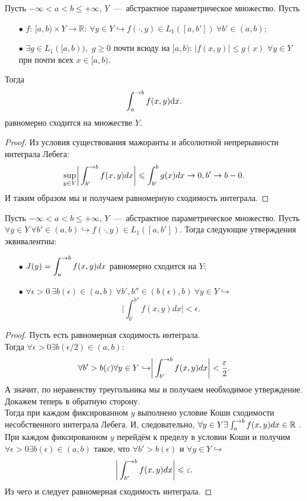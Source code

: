 \begin{theorem}
    Пусть $-\infty < a < b \leq +\infty$, $Y$~---~абстрактное параметрическое множество. Пусть
    \begin{enumerate}
        \item[$\bullet$] $f$: $[a, b) \times Y \to \mathbb{R}$: $\forall y \in Y \hookrightarrow f (\cdot, y) \in L_1 ([a, b']) \ \forall b' \in (a, b)$;
        \item[$\bullet$] $\exists g \in L_1 ([a, b)),$ $g \geq 0$ почти всюду на $[a, b)$: $|f(x, y)| \leq g(x)$ $\forall y \in Y$ при почти всех $x \in [a, b)$.
    \end{enumerate}
    Тогда \[
              \int_a^{\rightarrow b} f(x, y) \text{d}x.
    \]
    равномерно сходится на множестве $Y$.
\end{theorem}
\begin{proof}
    Из условия существования мажоранты и абсолютной непрерывности интеграла Лебега:
    \[
        \sup\limits_{y \in Y} \biggr| \int_{b'}^{\rightarrow b} f(x, y)dx \biggr| \leqslant \int_{b'}^{b} g(x)dx \rightarrow 0, b' \rightarrow b - 0.
    \]
    И таким образом мы и получаем равномерную сходимость интеграла.
\end{proof}
\begin{theorem}
    Пусть $-\infty < a < b \leq +\infty$, $Y$~---~абстрактное параметрическое множество. Пусть $\forall y \in Y \ \forall b' \in (a, b) \hookrightarrow f(\cdot, y) \in L_1([a, b'])$.
    Тогда следующие утверждения эквивалентны:
    \begin{enumerate}
        \item[$\bullet$] $\displaystyle J(y) = \int_a^{\rightarrow b} f(x, y)dx$ равномерно сходится на $Y$;
        \item[$\bullet$] $\forall \epsilon > 0 \ \exists b(\epsilon) \in (a, b) \ \forall b', b'' \in (b(\epsilon), b) \ \forall y \in Y \hookrightarrow$
        \[
            \biggr|\int_{b'}^{b''} f(x, y)dx \biggr| < \epsilon.
        \]
    \end{enumerate}
\end{theorem}
\begin{proof}
    Пусть есть равномерная сходимость интеграла. \\
    Тогда $\forall \epsilon > 0 \exists b(\epsilon/2) \in (a, b)$:
    \[
        \forall b' > b(\varepsilon) \forall y \in Y \hookrightarrow \biggr|\int_{b'}^{\rightarrow b}f(x, y)dx \biggr| < \dfrac{\varepsilon}{2}.
    \]
    А значит, по неравенству треугольника мы и получаем необходимое утверждение. \\
    Докажем теперь в обратную сторону. \\
    Тогда при каждом фиксированном $y$ выполнено условие Коши сходимости несобственного интеграла Лебега.
    И, следовательно, $\forall y \in Y \exists \int_{a}^{\rightarrow b} f(x, y)dx \in \mathbb{R}$ .
    При каждом фиксированном $y$ перейдём к пределу в условии Коши и получим $\forall \epsilon > 0 \exists b(\epsilon) \in (a, b)$ такое, что $\forall b' > b(\epsilon)$ и $\forall y \in Y \hookrightarrow$
    \[
        \biggr| \int_{b'}^{\rightarrow b}f(x, y)dx \biggr| \leqslant \varepsilon.
    \]
    Из чего и следует равномерная сходимость интеграла.
\end{proof}


